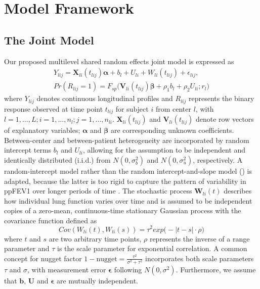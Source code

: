 \section{Model Framework} \label{sec:chp2_mod}

\subsection{The Joint Model}

Our proposed multilevel shared random effects joint model is expressed as 
\begin{equation} \label{eq:chp2_jm}
    \begin{gathered}
    Y_{lij}=\bm{X}_{li}(t_{lij})\bm{\alpha}+b_l+U_{li}+W_{li}(t_{lij}) + \epsilon_{lij}, \\
    Pr(R_{lij}=1)=F_{sp}\big(\bm{V}_{li}(t_{lij})\bm{\beta}+\rho_1 b_l + \rho_2 U_{li}; r_l\big)
    \end{gathered}
\end{equation}
where $Y_{lij}$ denotes continuous longitudinal profiles and $R_{lij}$ represents the binary response observed at time point $t_{lij}$ for subject $i$ from center $l$, with $l=1, \dots, L; i=1, \dots, n_l; j=1, \dots, n_{li}$. $\bm{X}_{li}(t_{lij})$ and $\bm{V}_{li}(t_{lij})$ denote row vectors of explanatory variables; $\bm{\alpha}$ and $\bm{\beta}$ are corresponding unknown coefficients. Between-center and between-patient heterogeneity are incorporated by random intercept terms $b_l$ and $U_{li}$, allowing for the assumption to be independent and identically distributed (i.i.d.) from $ N(0,\sigma_b^2)$ and $N(0,\sigma_u^2)$, respectively. A random-intercept model rather than the random intercept-and-slope model (\cite{Laird1982}) is adapted, because the latter is too rigid to capture the pattern of variability in ppFEV1 over longer periods of time \cite{TaylorRobinson2012}. The stochastic process $\bm{W}_{li}(t)$ describes how individual lung function varies over time and is assumed to be independent copies of a zero-mean, continuous-time stationary Gaussian process with the covariance function defined as 
\begin{equation}\label{eq:chp2_w}
Cov(W_{li}(t),W_{li}(s))=\tau^2 exp \big (-|t-s| \cdot \rho \big)
\end{equation}
where $t$ and $s$ are two arbitrary time points, $\rho$ represents the inverse of a range parameter and $\tau$ is the scale parameter for exponential correlation. A common concept for nugget factor $1-\mbox{nugget}=\frac{\tau^2}{\sigma^2 + \tau^2}$ incorporates both scale parameters $\tau$ and $\sigma$, with measurement error $\bm{\epsilon}$ following $N(0,\sigma^2)$. Furthermore, we assume that $\bm{b}$, $\bm{U}$ and $\bm{\epsilon}$ are mutually independent. 

